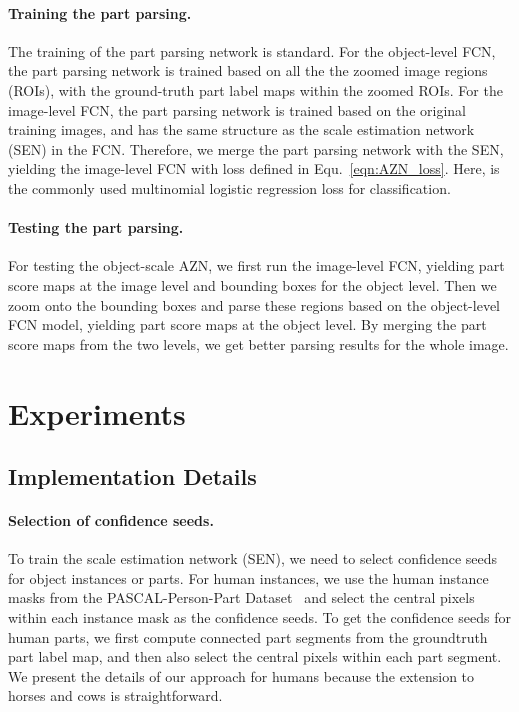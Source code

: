 \documentclass[runningheads]{llncs}
\begin{document}
\paragraph{Training the part parsing.} The training of the part parsing network is standard. For the object-level FCN, the part parsing network is trained based on all the the zoomed image regions (ROIs), with the ground-truth part label maps  within the zoomed ROIs. For the image-level FCN, the part parsing network is trained based on the original training images, and has the same structure as the scale estimation network (SEN) in the FCN. Therefore, we merge the part parsing network with the SEN, yielding the image-level FCN with loss defined in Equ.~\ref{eqn:AZN_loss}. Here,   is the commonly used multinomial logistic regression loss for classification.


\paragraph{Testing the part parsing.}  For testing the object-scale AZN, we first run the image-level FCN, yielding part score maps at the image level and bounding boxes for the object level. Then we zoom onto the bounding boxes and parse these regions based on the object-level FCN model, yielding part score maps at the object level. By merging the part score maps from the two levels, we get better parsing results for the whole image.

\section{Experiments}
\label{sec:exp}
\vspace{-0.4\baselineskip}
\subsection{Implementation Details}
\label{subsec:impDetails}
\paragraph{Selection of confidence seeds.}
To train the scale estimation network (SEN), we need to select confidence seeds for object instances or parts. For human instances, we use the human instance masks from the PASCAL-Person-Part Dataset~\cite{chen2014detect} and select the central  pixels within each instance mask as the confidence seeds. To get the confidence seeds for human parts, we first compute connected part segments from the groundtruth part label map, and then also select the central  pixels within each part segment. We present the details of our approach for humans because the extension to horses and cows is straightforward.
\end{document}
